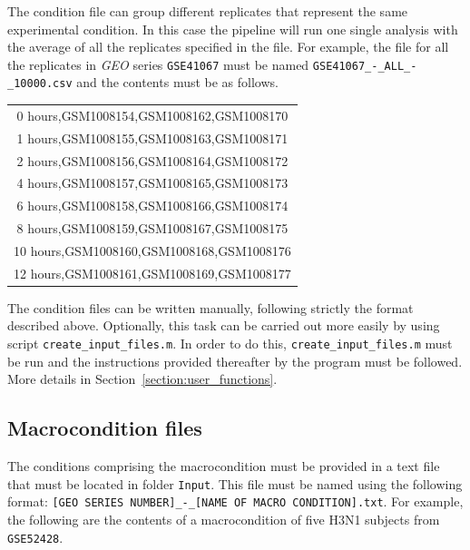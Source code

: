 \documentclass[final,letterpaper,twoside,12pt]{article}
\begin{document}
\par The condition file can group different replicates that represent the same experimental condition. In this case the pipeline will run one single analysis with the average of all the replicates specified in the file. For example, the file for all the replicates in \textit{GEO} series \texttt{GSE41067} must be named \texttt{GSE41067\_-\_ALL\_-\_10000.csv} and the contents must be as follows.

\begin{center}
\begin{tabular}{ c }

0 hours,GSM1008154,GSM1008162,GSM1008170 \\
1 hours,GSM1008155,GSM1008163,GSM1008171 \\
2 hours,GSM1008156,GSM1008164,GSM1008172 \\
4 hours,GSM1008157,GSM1008165,GSM1008173 \\
6 hours,GSM1008158,GSM1008166,GSM1008174 \\
8 hours,GSM1008159,GSM1008167,GSM1008175 \\
10 hours,GSM1008160,GSM1008168,GSM1008176 \\
12 hours,GSM1008161,GSM1008169,GSM1008177 \\


\end{tabular}
\end{center}

\par The condition files can be written manually, following strictly the format described above. Optionally, this task can be carried out more easily by using script \texttt{create\_input\_files.m}. In order to do this, \texttt{create\_input\_files.m} must be run and the instructions provided thereafter by the program must be followed. More details in Section~\ref{section:user_functions}.

\subsection{Macrocondition files}
\label{subsection:macrocondition}

\par The conditions comprising the macrocondition must be provided in a text file that must be located in folder \texttt{Input}. This file must be named using the following format: \texttt{[GEO SERIES NUMBER]\_-\_[NAME OF MACRO CONDITION].txt}. For example, the following are the contents of a macrocondition of five H3N1 subjects from \texttt{GSE52428}.
\end{document}

